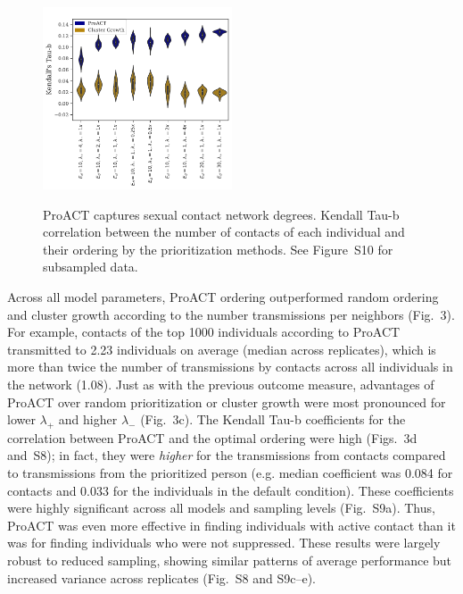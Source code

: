 \documentclass[a4paper,10pt]{article}
\begin{document}
\begin{figure}[!tp]
\centering
{\footnotesize
\includegraphics[width=0.5\textwidth]{figs/Fig4.pdf}%
\\
}
\caption{ProACT captures sexual contact network degrees.
 Kendall Tau-b correlation between the number of contacts of each individual and their ordering by the prioritization methods.
 See Figure~S10 for subsampled data. 
 }
\label{fig:efficacy-conc}
\end{figure}

Across all model parameters, ProACT ordering outperformed random ordering and cluster growth according to the number transmissions per neighbors (Fig.~3).
For example, contacts of the top 1000 individuals according to ProACT transmitted to 2.23 individuals on average (median across replicates), which is more than twice the number of transmissions by contacts across all individuals in the network (1.08).
Just as with the previous outcome measure, advantages of ProACT over random prioritization or cluster growth were most pronounced for lower $\lambda_{+}$ and higher $\lambda_{-}$ (Fig.~3c). 
The Kendall Tau-b coefficients for the correlation between ProACT and the optimal ordering were high (Figs.~3d and~S8); in fact, they were \textit{higher} for the transmissions from contacts compared to transmissions from the prioritized person (e.g. median coefficient was 0.084 for contacts and 0.033 for the individuals in the default condition). 
These coefficients were highly significant across all models and sampling levels (Fig.~S9a).
Thus, ProACT was even more effective in finding individuals with active contact than it was for finding individuals who were not suppressed. 
These results were largely robust to reduced sampling, showing similar patterns of average performance but increased variance across replicates (Fig.~S8 and S9c--e).
\end{document}

